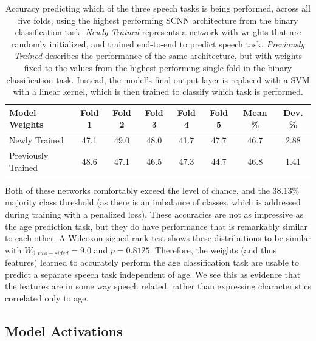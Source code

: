 \documentclass[fleqn,10pt]{wlscirep}
\begin{document}
\begin{table}[h]
 \caption{Accuracy predicting which of the three speech tasks is being performed, across all five folds, using the highest performing SCNN architecture from the binary classification task. \textit{Newly Trained} represents a network with weights that are randomly initialized, and trained end-to-end to predict speech task. \textit{Previously Trained} describes the performance of the same architecture, but with weights fixed to the values from the highest performing single fold in the binary classification task. Instead, the model's final output layer is replaced with a SVM with a linear kernel, which is then trained to classify which task is performed.}
 \centering
 \begin{tabular}{l | c | c | c | c | c | c | c}
   \toprule
   \textbf{Model Weights} & \textbf{Fold 1} & \textbf{Fold 2} & \textbf{Fold 3} & \textbf{Fold 4} & \textbf{Fold 5} & \textbf{Mean \%} & \textbf{Dev. \%}\\
   \toprule
                        Newly Trained           & 47.1 & 49.0 & 48.0 & 41.7 & 47.7 & 46.7 & 2.88 \\
   \midrule
                        Previously Trained      & 48.6 & 47.1 & 46.5 & 47.3 & 44.7 & 46.8 & 1.41 \\ 
   \bottomrule
 \end{tabular}
 \label{tab:task_results}
\end{table}

Both of these networks comfortably exceed the level of chance, and the $38.13\%$ majority class threshold (as there is an imbalance of classes, which is addressed during training with a penalized loss). These accuracies are not as impressive as the age prediction task, but they do have performance that is remarkably similar to each other. A Wilcoxon signed-rank test shows these distributions to be similar with $W_{9, two-sided}=9.0$ and $p=0.8125$. Therefore, the weights (and thus features) learned to accurately perform the age classification task are usable to predict a separate speech task independent of age. We see this as evidence that the features are in some way speech related, rather than expressing characteristics correlated only to age.

\subsection*{Model Activations}
\end{document}
